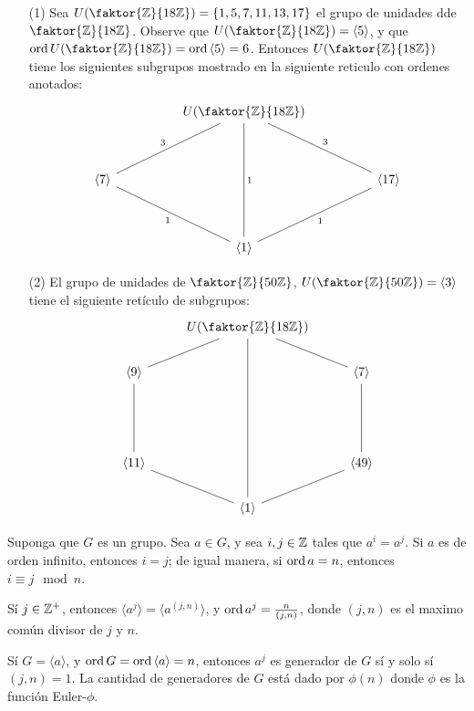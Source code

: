\begin{example}\label{}
    \begin{enumerate}
        \item[(1)] Sea $U(\faktor{\Z}{18\Z})=\{1,5,7,11,13,17\}$ el grupo de
            unidades dde $\faktor{\Z}{18\Z}$. Observe que
            $U(\faktor{\Z}{18\Z})=\langle 5 \rangle$, y que
            $\ord{U(\faktor{\Z}{18\Z})}=\ord{\langle 5 \rangle}=6$. Entonces
            $U(\faktor{\Z}{18\Z})$ tiene los siguientes subgrupos mostrado en la
            siguiente reticulo con ordenes anotados:
            \[\begin{tikzcd}
	&& {U(\faktor{\Z}{18\Z})} \\
	\\
	{\langle 7 \rangle} &&&& {\langle 17 \rangle} \\
	\\
	&& {\langle 1 \rangle}
	\arrow["3"', no head, from=1-3, to=3-1]
	\arrow["1"', no head, from=3-1, to=5-3]
	\arrow["1"', no head, from=5-3, to=3-5]
	\arrow["3"', no head, from=3-5, to=1-3]
	\arrow["1", no head, from=1-3, to=5-3]
\end{tikzcd}\]

    \item[(2)] El grupo de unidades de $\faktor{\Z}{50\Z}$,
        $U(\faktor{\Z}{50\Z})=\langle 3 \rangle$ tiene el siguiente ret\'iculo
        de subgrupos:
        \[\begin{tikzcd}
	& {U(\faktor{\Z}{18\Z})} \\
	{\langle 9 \rangle} && {\langle 7 \rangle} \\
	\\
	\\
	{\langle 11 \rangle} && {\langle 49 \rangle} \\
	& {\langle 1 \rangle}
	\arrow[no head, from=1-2, to=2-1]
	\arrow[no head, from=2-1, to=5-1]
	\arrow[no head, from=5-1, to=6-2]
	\arrow[no head, from=6-2, to=5-3]
	\arrow[no head, from=5-3, to=2-3]
	\arrow[no head, from=2-3, to=1-2]
	\arrow[no head, from=1-2, to=6-2]
\end{tikzcd}\]
    \end{enumerate}
\end{example}

\begin{theorem}\label{thm_3.4}
    Suponga que $G$ es un grupo. Sea $a \in G$,  y sea  $i,j \in \mathbb{Z}$ tales que
    $a^i=a^j$. Si $a$ es de orden infinito, entonces $i=j$; de igual manera, si
     $\operatorname{ord}{a}=n$, entonces $i \equiv j \mod{n}$.
\end{theorem}
\begin{corollary}
    S\'i $j \in \mathbb{Z}^+$, entonces  $\langle a^j \rangle=\langle a^{(j,n)}
    \rangle$, y $\operatorname{ord}{a^j}=\frac{n}{(j,n)}$, donde $(j,n)$ es el maximo com\'un
    divisor de $j$ y  $n$.
\end{corollary}
\begin{corollary}
    S\'i $G=\langle a \rangle$, y $\operatorname{ord}{G}=\operatorname{ord}{\langle a \rangle}=n$, entonces
    $a^j$ es generador de  $G$ s\'i y solo s\'i $(j,n)=1$. La cantidad de
    generadores de $G$ est\'a dado por  $\phi(n)$ donde $\phi$ es la funci\'on
    Euler-$\phi$.
\end{corollary}

